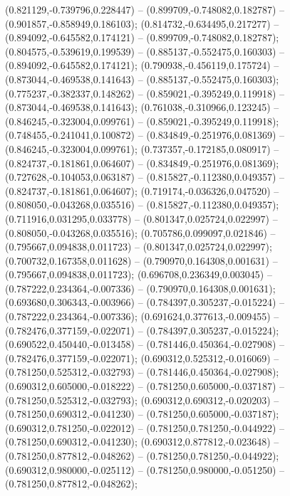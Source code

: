  (0.821129,-0.739796,0.228447) -- (0.899709,-0.748082,0.182787) -- (0.901857,-0.858949,0.186103);
 (0.814732,-0.634495,0.217277) -- (0.894092,-0.645582,0.174121) -- (0.899709,-0.748082,0.182787);
 (0.804575,-0.539619,0.199539) -- (0.885137,-0.552475,0.160303) -- (0.894092,-0.645582,0.174121);
 (0.790938,-0.456119,0.175724) -- (0.873044,-0.469538,0.141643) -- (0.885137,-0.552475,0.160303);
 (0.775237,-0.382337,0.148262) -- (0.859021,-0.395249,0.119918) -- (0.873044,-0.469538,0.141643);
 (0.761038,-0.310966,0.123245) -- (0.846245,-0.323004,0.099761) -- (0.859021,-0.395249,0.119918);
 (0.748455,-0.241041,0.100872) -- (0.834849,-0.251976,0.081369) -- (0.846245,-0.323004,0.099761);
 (0.737357,-0.172185,0.080917) -- (0.824737,-0.181861,0.064607) -- (0.834849,-0.251976,0.081369);
 (0.727628,-0.104053,0.063187) -- (0.815827,-0.112380,0.049357) -- (0.824737,-0.181861,0.064607);
 (0.719174,-0.036326,0.047520) -- (0.808050,-0.043268,0.035516) -- (0.815827,-0.112380,0.049357);
 (0.711916,0.031295,0.033778) -- (0.801347,0.025724,0.022997) -- (0.808050,-0.043268,0.035516);
 (0.705786,0.099097,0.021846) -- (0.795667,0.094838,0.011723) -- (0.801347,0.025724,0.022997);
 (0.700732,0.167358,0.011628) -- (0.790970,0.164308,0.001631) -- (0.795667,0.094838,0.011723);
 (0.696708,0.236349,0.003045) -- (0.787222,0.234364,-0.007336) -- (0.790970,0.164308,0.001631);
 (0.693680,0.306343,-0.003966) -- (0.784397,0.305237,-0.015224) -- (0.787222,0.234364,-0.007336);
 (0.691624,0.377613,-0.009455) -- (0.782476,0.377159,-0.022071) -- (0.784397,0.305237,-0.015224);
 (0.690522,0.450440,-0.013458) -- (0.781446,0.450364,-0.027908) -- (0.782476,0.377159,-0.022071);
 (0.690312,0.525312,-0.016069) -- (0.781250,0.525312,-0.032793) -- (0.781446,0.450364,-0.027908);
 (0.690312,0.605000,-0.018222) -- (0.781250,0.605000,-0.037187) -- (0.781250,0.525312,-0.032793);
 (0.690312,0.690312,-0.020203) -- (0.781250,0.690312,-0.041230) -- (0.781250,0.605000,-0.037187);
 (0.690312,0.781250,-0.022012) -- (0.781250,0.781250,-0.044922) -- (0.781250,0.690312,-0.041230);
 (0.690312,0.877812,-0.023648) -- (0.781250,0.877812,-0.048262) -- (0.781250,0.781250,-0.044922);
 (0.690312,0.980000,-0.025112) -- (0.781250,0.980000,-0.051250) -- (0.781250,0.877812,-0.048262);
